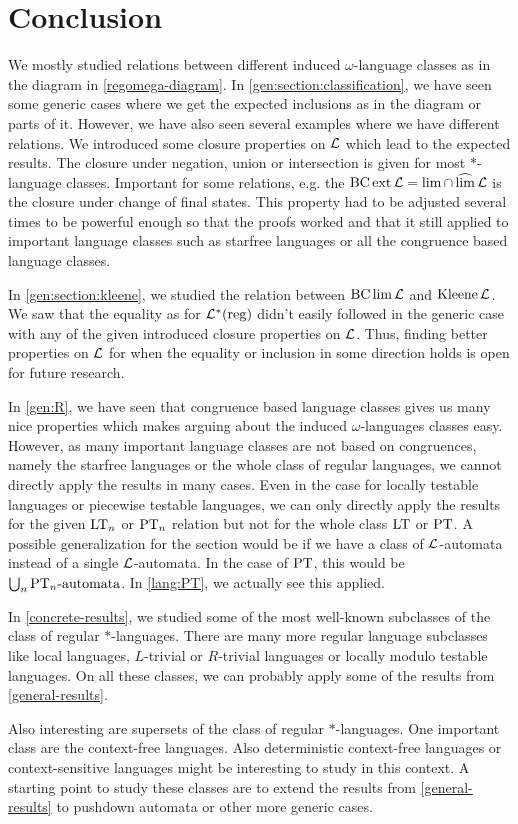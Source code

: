 \section{Conclusion}
\label{chapter:conclusion}

We mostly studied relations between different induced $\omega$-language classes as in the diagram in \cref{regomega-diagram}. In \cref{gen:section:classification}, we have seen some generic cases where we get the expected inclusions as in the diagram or parts of it. However, we have also seen several examples where we have different relations. We introduced some closure properties on $\mathcal{L}$ which lead to the expected results. The closure under negation, union or intersection is given for most $*$-language classes. Important for some relations, e.g. the $\operatorname{BC} \operatorname{ext} \mathcal{L} = \lim \cap \operatorname{\widehat{lim}} \mathcal{L}$ is the closure under change of final states. This property had to be adjusted several times to be powerful enough so that the proofs worked and that it still applied to important language classes such as starfree languages or all the congruence based language classes.

In \cref{gen:section:kleene}, we studied the relation between $\operatorname{BC} \lim \mathcal{L}$ and $\operatorname{Kleene} \mathcal{L}$. We saw that the equality as for $\mathcal{L}^*(\textup{\textrm{reg}})$ didn't easily followed in the generic case with any of the given introduced closure properties on $\mathcal{L}$. Thus, finding better properties on $\mathcal{L}$ for when the equality or inclusion in some direction holds is open for future research.

In \cref{gen:R}, we have seen that congruence based language classes gives us many nice properties which makes arguing about the induced $\omega$-languages classes easy. However, as many important language classes are not based on congruences, namely the starfree languages or the whole class of regular languages, we cannot directly apply the results in many cases. Even in the case for locally testable languages or piecewise testable languages, we can only directly apply the results for the given $\textup{\textrm{LT}}_n$ or $\textup{\textrm{PT}}_n$ relation but not for the whole class $\textup{\textrm{LT}}$ or $\textup{\textrm{PT}}$. A possible generalization for the section would be if we have a class of $\mathcal{L}$-automata instead of a single $\mathcal{L}$-automata. In the case of $\textup{\textrm{PT}}$, this would be $\bigcup_n \text{$\textup{\textrm{PT}}_n$-automata}$. In \cref{lang:PT}, we actually see this applied.

In \cref{concrete-results}, we studied some of the most well-known subclasses of the class of regular $*$-languages. There are many more regular language subclasses like local languages, $L$-trivial or $R$-trivial languages or locally modulo testable languages. On all these classes, we can probably apply some of the results from \cref{general-results}.

Also interesting are supersets of the class of regular $*$-languages. One important class are the context-free languages. Also deterministic context-free languages or context-sensitive languages might be interesting to study in this context. A starting point to study these classes are to extend the results from \cref{general-results} to pushdown automata or other more generic cases.
